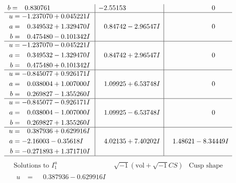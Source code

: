 \documentclass[1p]{elsarticle_modified}
\theoremstyle{definition}
\newcommand{\I}{\sqrt{-1}}
\begin{document}
$$\begin{array}{c|c|c}
\begin{aligned}
b &= \phantom{-}0.830761\phantom{ +0.000000I}\end{aligned}
 & -2.55153\phantom{ +0.000000I} & \phantom{-0.000000 } 0 \\ \hline\begin{aligned}
u &= -1.237070 + 0.045221 I \\
a &= \phantom{-}0.349532 + 1.329470 I \\
b &= \phantom{-}0.475480 - 0.101342 I\end{aligned}
 & \phantom{-}0.84742 - 2.96547 I & \phantom{-0.000000 } 0 \\ \hline\begin{aligned}
u &= -1.237070 - 0.045221 I \\
a &= \phantom{-}0.349532 - 1.329470 I \\
b &= \phantom{-}0.475480 + 0.101342 I\end{aligned}
 & \phantom{-}0.84742 + 2.96547 I & \phantom{-0.000000 } 0 \\ \hline\begin{aligned}
u &= -0.845077 + 0.926171 I \\
a &= \phantom{-}0.038004 + 1.007000 I \\
b &= \phantom{-}0.269827 - 1.355260 I\end{aligned}
 & \phantom{-}1.09925 + 6.53748 I & \phantom{-0.000000 } 0 \\ \hline\begin{aligned}
u &= -0.845077 - 0.926171 I \\
a &= \phantom{-}0.038004 - 1.007000 I \\
b &= \phantom{-}0.269827 + 1.355260 I\end{aligned}
 & \phantom{-}1.09925 - 6.53748 I & \phantom{-0.000000 } 0 \\ \hline\begin{aligned}
u &= \phantom{-}0.387936 + 0.629916 I \\
a &= -2.16003 - 0.35618 I \\
b &= -0.271893 + 1.371710 I\end{aligned}
 & \phantom{-}4.02135 + 7.40202 I & \phantom{-}1.48621 - 8.34449 I\\
 \hline 
 \end{array}$$\newpage$$\begin{array}{c|c|c}  
\text{Solutions to }I^u_{1}& \I (\text{vol} + \sqrt{-1}CS) & \text{Cusp shape}\\
 \hline 
\begin{aligned}
u &= \phantom{-}0.387936 - 0.629916 I \\

\end{aligned}
\end{array}$$
\end{document}
